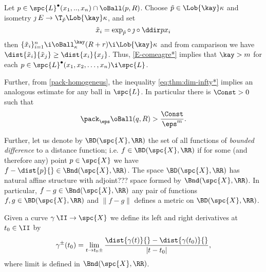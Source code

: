Let $p\in \spc{L}^\bullet(x_1,..,x_n)\cap \oBall(p,R)$.
Choose $\tilde p\in\Lob{\kay}\kappa$ and isometry $\jmath\:E\to \T_{\tilde p}\Lob{\kay}\kappa$, and set 
$$\tilde x_i=\exp_{\tilde p}\circ\,\jmath\circ\ddir p{x_i}$$ 
then $\{\tilde x_i\}_{i=1}^n\i \oBall^\kay_\kappa(R+r)\i \Lob{\kay}\kappa$ and from camparison we have $\dist{\tilde x_i}{\tilde x_j}\ge \dist{x_i}{x_j}$.
Thus, \ref{E-comeagre*} implies that $\kay>m$ for each $p\in \spc{L}^\bullet(x_1,x_2,\dots,x_n)\i \spc{L}$.












Further, from \ref{pack-homogeneus}, the inequality \ref{eq:thm:dim-infty*} implies an analogous estimate for any ball in $\spc{L}$.
In particular there is $\Const>0$ such that
$$\pack_\eps \oBall(q,R)>\frac{\Const}{\eps^m}.$$
















Further, let us denote by
$\BD(\spc{X},\RR)$ the set of all functions of \emph{bounded difference} to a distance function;
i.e.  $f\in\BD(\spc{X},\RR)$ if for some (and therefore any) point $p\in\spc{X}$ we have $f-\dist{p}{}\in\Bnd(\spc{X},\RR)$.
The space $\BD(\spc{X},\RR)$ has natural affine structure with adjoint??? space formed by $\Bnd(\spc{X},\RR)$.
In particular, $f-g\in\Bnd(\spc{X},\RR)$ any pair of functions $f,g\in\BD(\spc{X},\RR)$
and $\|f-g\|$ defines a metric on $\BD(\spc{X},\RR)$.
















Given a curve $\gamma\:\II\to\spc{X}$ we define its left and right derivatives at $t_0\in\II$ by
$$\gamma^\pm(t_0)=\lim_{t\to t_0\pm}\frac{\dist{\gamma(t)}{}-\dist{\gamma(t_0)}{}}{|t-t_0|},$$
where limit is defined in $\Bnd(\spc{X},\RR)$.













